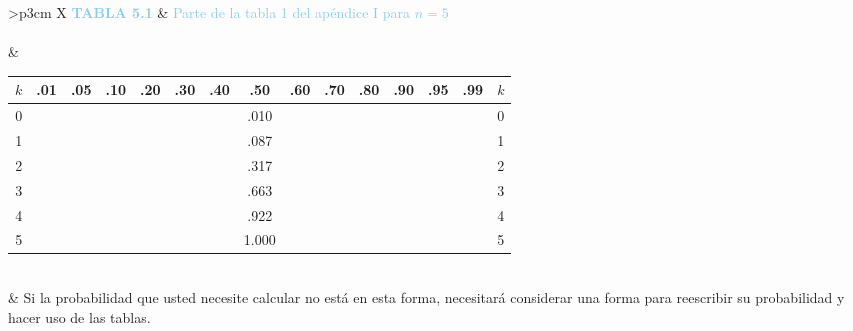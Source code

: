 \documentclass[12pt]{book}
\newenvironment{tablacaja}{\begin{center}}{\end{center}}
\begin{document}
	
	\noindent
	\begin{tabularx}{\textwidth}{>{\raggedleft\arraybackslash}p{3cm} X}
		\textcolor{SkyBlue}{\textbf{TABLA 5.1}}  
		& {\large\textcolor{SkyBlue}{Parte de la tabla 1 del apéndice I para $n=5$}}\\[-4pt]
		 \\[-10pt]
		
		& \begin{tablacaja}
			\renewcommand{\arraystretch}{1.25}
			\begin{tabular}{c|ccccccccccccc|c}
				\toprule
				$k$ & .01 & .05 & .10 & .20 & .30 & .40 & .50 & .60 & .70 & .80 & .90 & .95 & .99 & $k$ \\
				\midrule
				0 & & & & & & & .010 & & & & & & & 0 \\
				1 & & & & & & & .087 & & & & & & & 1 \\
				2 & & & & & & & .317 & & & & & & & 2 \\
				3 & & & & & & & .663 & & & & & & & 3 \\
				4 & & & & & & & .922 & & & & & & & 4 \\
				5 & & & & & & & 1.000 & & & & & & & 5 \\
				\bottomrule
			\end{tabular}
		\end{tablacaja} \\[7pt]
		
		& \noindent\normalsize{Si la probabilidad que usted necesite calcular no está en esta forma, necesitará considerar una forma para reescribir su probabilidad y hacer uso de las tablas.} \\
	\end{tabularx}
	
	\vspace{7pt}
	
\end{document}
